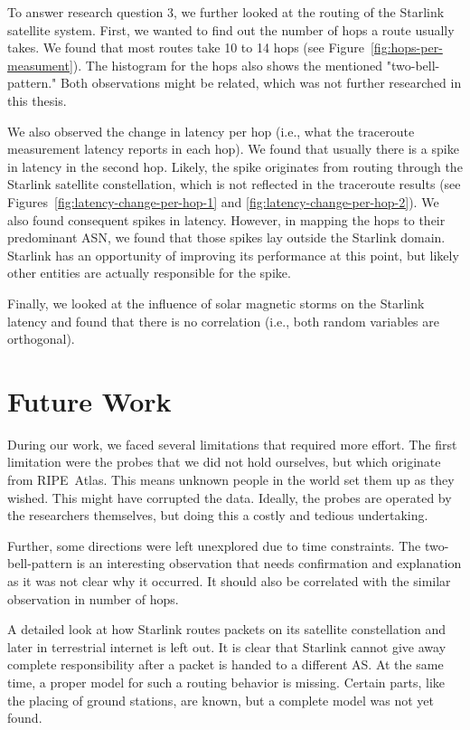 To answer research question 3, we further looked at the routing of the Starlink
satellite system. First, we wanted to find out the number of hops a route
usually takes. We found that most routes take 10 to 14 hops (see
Figure~\ref{fig:hops-per-measument}). The histogram for the hops also shows the
mentioned "two-bell-pattern." Both observations might be related, which was not
further researched in this thesis.

We also observed the change in latency per hop (i.e., what the traceroute
measurement latency reports in each hop). We found that usually there is a
spike in latency in the second hop. Likely, the spike originates from routing
through the Starlink satellite constellation, which is not reflected in the
traceroute results (see Figures~\ref{fig:latency-change-per-hop-1} and
\ref{fig:latency-change-per-hop-2}). We also found consequent spikes in
latency. However, in mapping the hops to their predominant ASN, we found that
those spikes lay outside the Starlink domain. Starlink has an opportunity of
improving its performance at this point, but likely other entities are actually
responsible for the spike.

Finally, we looked at the influence of solar magnetic storms on the Starlink
latency and found that there is no correlation (i.e., both random
variables are orthogonal).

\section{Future Work}

During our work, we faced several limitations that required more effort. The
first limitation were the probes that we did not hold ourselves, but which
originate from RIPE~Atlas. This means unknown people in the world set them up
as they wished. This might have corrupted the data. Ideally, the probes are
operated by the researchers themselves, but doing this a costly and tedious
undertaking.

Further, some directions were left unexplored due to time constraints. The
two-bell-pattern is an interesting observation that needs confirmation and
explanation as it was not clear why it occurred. It should also be correlated
with the similar observation in number of hops.

A detailed look at how Starlink routes packets on its satellite constellation
and later in terrestrial internet is left out. It is clear that Starlink cannot
give away complete responsibility after a packet is handed to a different AS.
At the same time, a proper model for such a routing behavior is missing.
Certain parts, like the placing of ground stations, are known, but a complete
model was not yet found.

